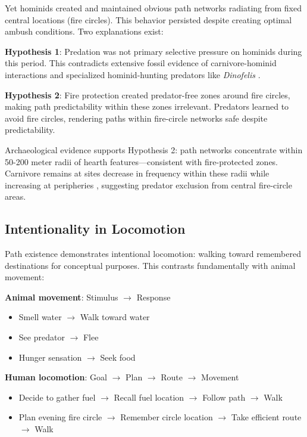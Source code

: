 Yet hominids created and maintained obvious path networks radiating from fixed central locations (fire circles). This behavior persisted despite creating optimal ambush conditions. Two explanations exist:

\textbf{Hypothesis 1}: Predation was not primary selective pressure on hominids during this period. This contradicts extensive fossil evidence of carnivore-hominid interactions and specialized hominid-hunting predators like \textit{Dinofelis} \citep{lewis2006carnivore}.

\textbf{Hypothesis 2}: Fire protection created predator-free zones around fire circles, making path predictability within these zones irrelevant. Predators learned to avoid fire circles, rendering paths within fire-circle networks safe despite predictability.

Archaeological evidence supports Hypothesis 2: path networks concentrate within 50-200 meter radii of hearth features—consistent with fire-protected zones. Carnivore remains at sites decrease in frequency within these radii while increasing at peripheries \citep{brain1981hunters}, suggesting predator exclusion from central fire-circle areas.

\subsection{Intentionality in Locomotion}

Path existence demonstrates intentional locomotion: walking toward remembered destinations for conceptual purposes. This contrasts fundamentally with animal movement:

\textbf{Animal movement}: Stimulus $\rightarrow$ Response
\begin{itemize}
\item Smell water $\rightarrow$ Walk toward water
\item See predator $\rightarrow$ Flee
\item Hunger sensation $\rightarrow$ Seek food
\end{itemize}

\textbf{Human locomotion}: Goal $\rightarrow$ Plan $\rightarrow$ Route $\rightarrow$ Movement
\begin{itemize}
\item Decide to gather fuel $\rightarrow$ Recall fuel location $\rightarrow$ Follow path $\rightarrow$ Walk
\item Plan evening fire circle $\rightarrow$ Remember circle location $\rightarrow$ Take efficient route $\rightarrow$ Walk
\end{itemize}

